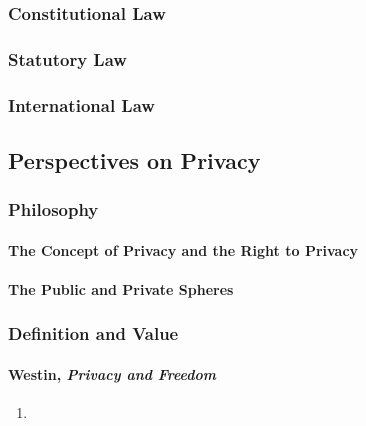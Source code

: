 \subsubsection{Constitutional Law}


\subsubsection{Statutory Law}


\subsubsection{International Law}


\subsection{Perspectives on Privacy}

\subsubsection{Philosophy}

\paragraph{The Concept of Privacy and the Right to Privacy}


\paragraph{The Public and Private Spheres}


\subsubsection{Definition and Value}

\paragraph{Westin, \emph{Privacy and Freedom}}

\begin{enumerate}
    \item %
\end{enumerate}

